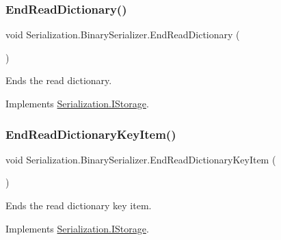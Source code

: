 \subsubsection{\texorpdfstring{End\+Read\+Dictionary()}{EndReadDictionary()}}
{\footnotesize\ttfamily void Serialization.\+Binary\+Serializer.\+End\+Read\+Dictionary (\begin{DoxyParamCaption}{ }\end{DoxyParamCaption})\hspace{0.3cm}{\ttfamily [inline]}}



Ends the read dictionary. 



Implements \hyperlink{interface_serialization_1_1_i_storage_a361427cb53d37e663b456b97d087575b}{Serialization.\+I\+Storage}.

\mbox{\label{class_serialization_1_1_binary_serializer_a40a35f67bceb9c7c1cac774afe4b5fd0}} 
\subsubsection{\texorpdfstring{End\+Read\+Dictionary\+Key\+Item()}{EndReadDictionaryKeyItem()}}
{\footnotesize\ttfamily void Serialization.\+Binary\+Serializer.\+End\+Read\+Dictionary\+Key\+Item (\begin{DoxyParamCaption}{ }\end{DoxyParamCaption})\hspace{0.3cm}{\ttfamily [inline]}}



Ends the read dictionary key item. 



Implements \hyperlink{interface_serialization_1_1_i_storage_afdfcddaf43f8c474af85a0667541f785}{Serialization.\+I\+Storage}.

\mbox{\label{class_serialization_1_1_binary_serializer_ab8d362901844c2b1aa7420269f72fa50}} 
